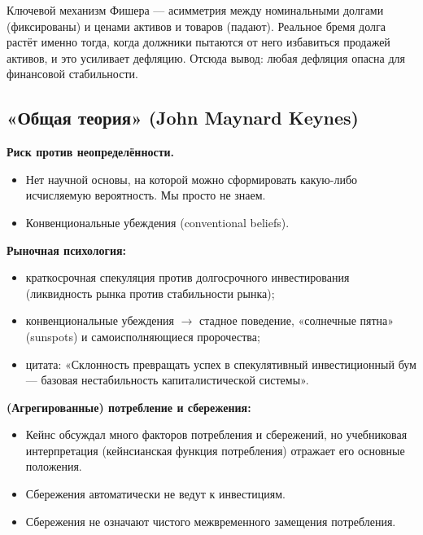 \documentclass[10pt,a4paper]{article}
\begin{document}
\begin{intuition}
Ключевой механизм Фишера — асимметрия между номинальными долгами (фиксированы) и ценами активов и товаров (падают). Реальное бремя долга растёт именно тогда, когда должники пытаются от него избавиться продажей активов, и это усиливает дефляцию. Отсюда вывод: любая дефляция опасна для финансовой стабильности.
\end{intuition}

\subsection{«Общая теория» (John Maynard Keynes)}

\textbf{Риск против неопределённости.}
\begin{itemize}[leftmargin=1.3em]
\item Нет научной основы, на которой можно сформировать какую-либо исчисляемую вероятность. Мы просто не знаем.
\item Конвенциональные убеждения (conventional beliefs).
\end{itemize}

\textbf{Рыночная психология:}
\begin{itemize}[leftmargin=1.3em]
\item краткосрочная спекуляция против долгосрочного инвестирования (ликвидность рынка против стабильности рынка);
\item конвенциональные убеждения $\to$ стадное поведение, «солнечные пятна» (sunspots) и самоисполняющиеся пророчества;
\item цитата: «Склонность превращать успех в спекулятивный инвестиционный бум — базовая нестабильность капиталистической системы».
\end{itemize}

\textbf{(Агрегированные) потребление и сбережения:}
\begin{itemize}[leftmargin=1.3em]
\item Кейнс обсуждал много факторов потребления и сбережений, но учебниковая интерпретация (кейнсианская функция потребления) отражает его основные положения.
\item Сбережения автоматически не ведут к инвестициям.
\item Сбережения не означают чистого межвременного замещения потребления.
\end{itemize}
\end{document}
